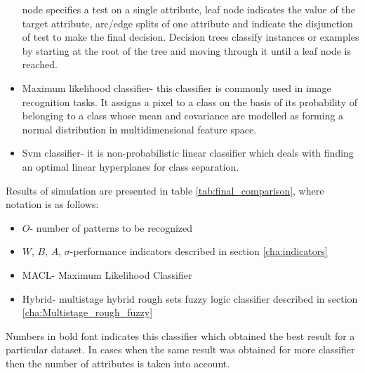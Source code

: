\begin{itemize}
        node specifies a test on a single attribute, leaf node indicates the
        value of the target attribute, arc/edge splits of one attribute and
        indicate the disjunction of test to make the final decision. 
        Decision trees classify instances or examples by starting at the root 
        of the tree and moving through it until a leaf node is reached.
    \item Maximum likelihood classifier- this classifier is commonly used in
        image recognition tasks. It assigns a pixel to a class on the basis of
        its probability of belonging to a class whose mean and covariance are
        modelled as forming a normal distribution in multidimensional feature
        space.
    \item Svm classifier- it is non-probabilistic linear classifier which 
        deals with finding an optimal linear hyperplanes for class separation.
\end{itemize}
Results of simulation are presented in table \ref{tab:final_comparison}, where
notation is as follows:
\begin{itemize}
    \item $O$- number of patterns to be recognized
    \item $W$, $B$, $A$, $\sigma$-performance indicators described in section \ref{cha:indicators}
    \item MACL- Maximum Likelihood Classifier
    \item Hybrid- multistage hybrid rough sets fuzzy logic classifier described
        in section \ref{cha:Multistage_rough_fuzzy}
\end{itemize}
Numbers in bold font indicates this
classifier which obtained the best result for a particular dataset. In cases
when the same result was obtained for more classifier then the number of
attributes is taken into account.

